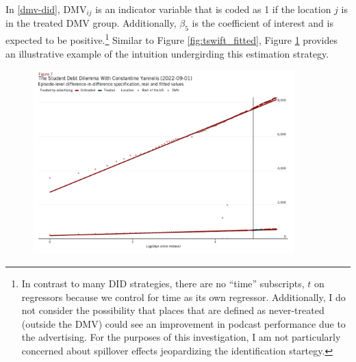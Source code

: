 \documentclass[11pt, letterpaper, twoside]{article}
\begin{document}
In \eqref{dmv-did}, $\text{DMV}_{ij}$ is an indicator variable that is coded as 1 if the location $j$ is in the treated DMV group. Additionally, $\beta_5$ is the coefficient of interest and is expected to be positive.\footnote{In contrast to many DID strategies, there are no ``time'' subscripts, $t$ on regressors because we control for time as its own regressor. Additionally, I do not consider the possibility that places that are defined as never-treated (outside the DMV) could see an improvement in podcast performance due to the advertising. For the purposes of this investigation, I am not particularly concerned about spillover effects jeopardizing the identification startegy.} Similar to Figure \ref{fig:tswift_fitted}, Figure \ref{fig:yannelis-did-RoUS} provides an illustrative example of the intuition undergirding this estimation strategy.\\

\begin{figure}[!htb]
  \centering
  \includegraphics[width=0.9\textwidth]{figures/yannelis_did_whole_country_plot.png}
  \caption{}
  \label{fig:yannelis-did-RoUS}
\end{figure}
\end{document}
